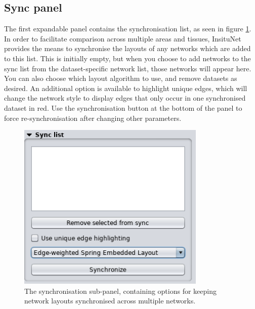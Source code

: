 \documentclass[a4paper,12pt]{article}
\begin{document}
\subsection{Sync panel}
The first expandable panel contains the synchronisation list, as seen in figure \ref{fig:sync}. In order to facilitate comparison across multiple areas and tissues, InsituNet provides the means to synchronise the layouts of any networks which are added to this list. This is initially empty, but when you choose to add networks to the sync list from the dataset-specific network list, those networks will appear here. You can also choose which layout algorithm to use, and remove datasets as desired. An additional option is available to highlight unique edges, which will change the network style to display edges that only occur in one synchronised dataset in red. Use the synchronisation button at the bottom of the panel to force re-synchronisation after changing other parameters.

\begin{figure}[htb]
	\caption{The synchronisation sub-panel, containing options for keeping network layouts synchronised across multiple networks.}\label{fig:sync}
	\centering
	\includegraphics[width=0.8\textwidth]{sync}
\end{figure}
\end{document}
